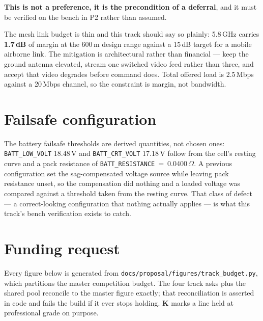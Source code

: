 \documentclass[11pt,a4paper]{article}
\begin{document}
\textbf{This is not a preference, it is the precondition of a deferral}, and it
must be verified on the bench in P2 rather than assumed.

The mesh link budget is thin and this track should say so plainly: 5.8\,GHz
carries \textbf{1.7\,dB} of margin at the 600\,m design range against a 15\,dB
target for a mobile airborne link. The mitigation is architectural rather than
financial --- keep the ground antenna elevated, stream one switched video feed
rather than three, and accept that video degrades before command does. Total
offered load is 2.5\,Mbps against a 20\,Mbps channel, so the constraint is
margin, not bandwidth.

\section{Failsafe configuration}

The battery failsafe thresholds are derived quantities, not chosen ones:
\texttt{BATT\_LOW\_VOLT} 18.48\,V and \texttt{BATT\_CRT\_VOLT} 17.18\,V follow
from the cell's resting curve and a pack resistance of
\texttt{BATT\_RESISTANCE}~=~0.0400\,$\Omega$. A previous configuration set the
sag-compensated voltage source while leaving pack resistance unset, so the
compensation did nothing and a loaded voltage was compared against a threshold
taken from the resting curve. That class of defect --- a correct-looking
configuration that nothing actually applies --- is what this track's bench
verification exists to catch.

\section{Funding request}

Every figure below is generated from
\texttt{docs/proposal/figures/track\_budget.py}, which partitions the master
competition budget. The four track asks plus the shared pool reconcile to the
master figure exactly; that reconciliation is asserted in code and fails the
build if it ever stops holding. \textbf{K} marks a line held at professional
grade on purpose.
\end{document}

